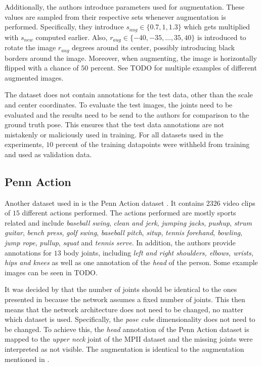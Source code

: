 Additionally, the authors introduce parameters used for augmentation.
These values are sampled from their respective sets whenever augmentation is performed.
Specifically, they introduce $s_{aug} \in \{0.7, 1, 1.3\}$ which gets multiplied with $s_{new}$ computed earlier.
Also, $r_{aug} \in \{-40, -35, \dots, 35, 40\}$ is introduced to rotate the image $r_{aug}$ degrees around its center, possibly introducing black borders around the image.
Moreover, when augmenting, the image is horizontally flipped with a chance of $50$ percent.
See TODO for multiple examples of different augmented images. 

The dataset does not contain annotations for the test data, other than the scale and center coordinates.
To evaluate the test images, the joints need to be evaluated and the results need to be send to the authors for comparison to the ground truth pose.
This ensures that the test data annotations are not mistakenly or maliciously used in training.
For all datasets used in the experiments, $10$ percent of the training datapoints were withheld from training and used as validation data.

\subsection{Penn Action}
\label{sec:exp-penn}

Another dataset used in \cite{luvizon_2d/3d_2018} is the Penn Action dataset \cite{zhang_actemes_2013}.
It contains $2326$ video clips of $15$ different actions performed.
The actions performed are mostly sports related and include \textit{baseball swing}, \textit{clean and jerk}, \textit{jumping jacks}, \textit{pushup}, \textit{strum guitar}, \textit{bench press}, \textit{golf swing}, \textit{baseball pitch}, \textit{situp}, \textit{tennis forehand}, \textit{bowling}, \textit{jump rope}, \textit{pullup}, \textit{squat} and \textit{tennis serve}.
In addition, the authors provide annotations for $13$ body joints,
including \textit{left and right shoulders, elbows, wrists, hips and knees} as well as one annotation of the \textit{head} of the person.
Some example images can be seen in TODO. 

It was decided by \cite{luvizon_2d/3d_2018} that the number of joints should be identical to the ones presented in \cite{andriluka_2d_2014}  because the network assumes a fixed number of joints.
This then means that the network architecture does not need to be changed, no matter which dataset is used.
Specifically, the \textit{pose cube} dimensionality does not need to be changed.
To achieve this, the \textit{head} annotation of the Penn Action dataset is mapped to the \textit{upper neck} joint of the MPII dataset and the missing joints were interpreted as not visible.
The augmentation is identical to the augmentation mentioned in .

